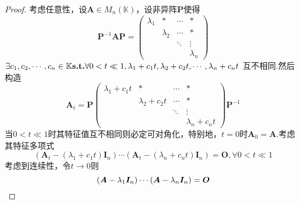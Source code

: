 \begin{proof}
    考虑任意性，设$\bm{A}\in M_n\left(\mathbb{K}\right)$，设非异阵$\bm{P}$使得
    \[
        \bm{P}^{-1}\bm{AP}=\begin{pmatrix}
            \lambda_1 & *         & \cdots & *         \\
                      & \lambda_2 & \cdots & *         \\
                      &           & \ddots & \vdots    \\
                      &           &        & \lambda_n
        \end{pmatrix}
    \]$\exists c_1,c_2,\cdots,c_n\in\mathbb{K}\textup{\bfseries{s.t.}}\forall 0<t\ll 1,\lambda_1+c_1t,
        \lambda_2+c_2t,\cdots,\lambda_n+c_nt$
    互不相同.然后构造
    \[
        \bm{A}_t=
        \bm{P}\begin{pmatrix}
            \lambda_1+c_1t & *              & \cdots & *              \\
                           & \lambda_2+c_2t & \cdots & *              \\
                           &                & \ddots & \vdots         \\
                           &                &        & \lambda_n+c_nt
        \end{pmatrix}\bm{P}^{-1}
    \]当$0<t\ll 1$时其特征值互不相同则必定可对角化，特别地，$t=0$时$\bm{A}_0=\bm{A}.$考虑其特征多项式
    \[
        \left(
        \bm{A}_t-\left(\lambda_1+c_1t\right)\bm{I}_n
        \right)\cdots\left(
        \bm{A}_t-\left(\lambda_n+c_nt\right)\bm{I}_n
        \right)=\bm{O},\forall 0<t\ll 1
    \]
    考虑到连续性，令$t\to 0$则
    \[
        \left(
        \bm{A}-\lambda_1\bm{I}_n
        \right)\cdots\left(
        \bm{A}-\lambda_n\bm{I}_n
        \right)=\bm{O}\qedhere
    \]
\end{proof}
